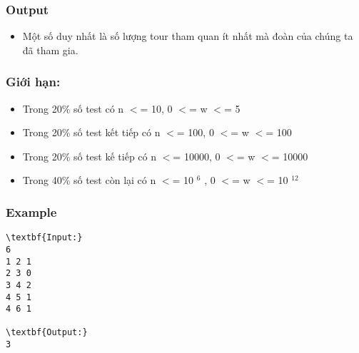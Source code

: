 \subsubsection{Output}
\begin{itemize}
	\item Một số duy nhất là số lượng tour tham quan ít nhất mà đoàn của chúng ta đã tham gia.
\end{itemize}

\subsubsection{Giới hạn:}
\begin{itemize}
	\item Trong 20\% số test có n $<$= 10, 0 $<$= w $<$= 5
	\item Trong 20\% số test kết tiếp có n $<$= 100, 0 $<$= w $<$= 100
	\item Trong 20\% số test kế tiếp có n $<$= 10000, 0 $<$= w $<$= 10000
	\item Trong 40\% số test còn lại có n $<$= 10 $^ 6 $ , 0 $<$= w $<$= 10 $^ 12 $
\end{itemize}

\subsubsection{Example}
\begin{verbatim}
\textbf{Input:}
6
1 2 1
2 3 0
3 4 2
4 5 1
4 6 1

\textbf{Output:}
3\end{verbatim}